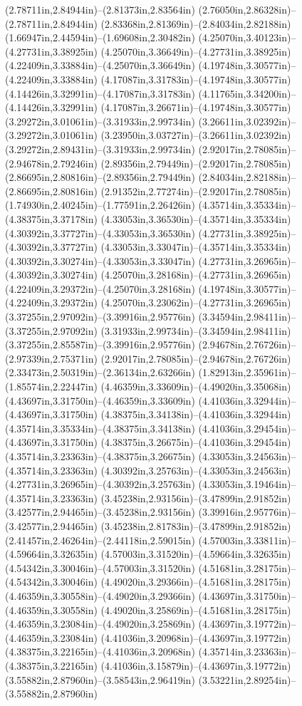 (2.78711in,2.84944in)--(2.81373in,2.83564in) (2.76050in,2.86328in)--(2.78711in,2.84944in) (2.83368in,2.81369in)--(2.84034in,2.82188in) (1.66947in,2.44594in)--(1.69608in,2.30482in) (4.25070in,3.40123in)--(4.27731in,3.38925in) (4.25070in,3.36649in)--(4.27731in,3.38925in) (4.22409in,3.33884in)--(4.25070in,3.36649in) (4.19748in,3.30577in)--(4.22409in,3.33884in) (4.17087in,3.31783in)--(4.19748in,3.30577in) (4.14426in,3.32991in)--(4.17087in,3.31783in) (4.11765in,3.34200in)--(4.14426in,3.32991in) (4.17087in,3.26671in)--(4.19748in,3.30577in) (3.29272in,3.01061in)--(3.31933in,2.99734in) (3.26611in,3.02392in)--(3.29272in,3.01061in) (3.23950in,3.03727in)--(3.26611in,3.02392in) (3.29272in,2.89431in)--(3.31933in,2.99734in) (2.92017in,2.78085in)--(2.94678in,2.79246in) (2.89356in,2.79449in)--(2.92017in,2.78085in) (2.86695in,2.80816in)--(2.89356in,2.79449in) (2.84034in,2.82188in)--(2.86695in,2.80816in) (2.91352in,2.77274in)--(2.92017in,2.78085in) (1.74930in,2.40245in)--(1.77591in,2.26426in) (4.35714in,3.35334in)--(4.38375in,3.37178in) (4.33053in,3.36530in)--(4.35714in,3.35334in) (4.30392in,3.37727in)--(4.33053in,3.36530in) (4.27731in,3.38925in)--(4.30392in,3.37727in) (4.33053in,3.33047in)--(4.35714in,3.35334in) (4.30392in,3.30274in)--(4.33053in,3.33047in) (4.27731in,3.26965in)--(4.30392in,3.30274in) (4.25070in,3.28168in)--(4.27731in,3.26965in) (4.22409in,3.29372in)--(4.25070in,3.28168in) (4.19748in,3.30577in)--(4.22409in,3.29372in) (4.25070in,3.23062in)--(4.27731in,3.26965in) (3.37255in,2.97092in)--(3.39916in,2.95776in) (3.34594in,2.98411in)--(3.37255in,2.97092in) (3.31933in,2.99734in)--(3.34594in,2.98411in) (3.37255in,2.85587in)--(3.39916in,2.95776in) (2.94678in,2.76726in)--(2.97339in,2.75371in) (2.92017in,2.78085in)--(2.94678in,2.76726in) (2.33473in,2.50319in)--(2.36134in,2.63266in) (1.82913in,2.35961in)--(1.85574in,2.22447in) (4.46359in,3.33609in)--(4.49020in,3.35068in) (4.43697in,3.31750in)--(4.46359in,3.33609in) (4.41036in,3.32944in)--(4.43697in,3.31750in) (4.38375in,3.34138in)--(4.41036in,3.32944in) (4.35714in,3.35334in)--(4.38375in,3.34138in) (4.41036in,3.29454in)--(4.43697in,3.31750in) (4.38375in,3.26675in)--(4.41036in,3.29454in) (4.35714in,3.23363in)--(4.38375in,3.26675in) (4.33053in,3.24563in)--(4.35714in,3.23363in) (4.30392in,3.25763in)--(4.33053in,3.24563in) (4.27731in,3.26965in)--(4.30392in,3.25763in) (4.33053in,3.19464in)--(4.35714in,3.23363in) (3.45238in,2.93156in)--(3.47899in,2.91852in) (3.42577in,2.94465in)--(3.45238in,2.93156in) (3.39916in,2.95776in)--(3.42577in,2.94465in) (3.45238in,2.81783in)--(3.47899in,2.91852in) (2.41457in,2.46264in)--(2.44118in,2.59015in) (4.57003in,3.33811in)--(4.59664in,3.32635in) (4.57003in,3.31520in)--(4.59664in,3.32635in) (4.54342in,3.30046in)--(4.57003in,3.31520in) (4.51681in,3.28175in)--(4.54342in,3.30046in) (4.49020in,3.29366in)--(4.51681in,3.28175in) (4.46359in,3.30558in)--(4.49020in,3.29366in) (4.43697in,3.31750in)--(4.46359in,3.30558in) (4.49020in,3.25869in)--(4.51681in,3.28175in) (4.46359in,3.23084in)--(4.49020in,3.25869in) (4.43697in,3.19772in)--(4.46359in,3.23084in) (4.41036in,3.20968in)--(4.43697in,3.19772in) (4.38375in,3.22165in)--(4.41036in,3.20968in) (4.35714in,3.23363in)--(4.38375in,3.22165in) (4.41036in,3.15879in)--(4.43697in,3.19772in) (3.55882in,2.87960in)--(3.58543in,2.96419in) (3.53221in,2.89254in)--(3.55882in,2.87960in) 
